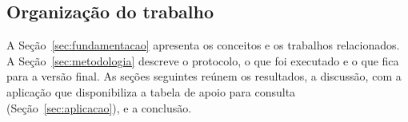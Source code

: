 \subsection{Organização do trabalho}
A Seção~\ref{sec:fundamentacao} apresenta os conceitos e os trabalhos relacionados. A
Seção~\ref{sec:metodologia} descreve o protocolo, o que foi executado e o que fica para a versão final. As seções seguintes reúnem os resultados, a discussão, com a
aplicação que disponibiliza a tabela de apoio para consulta (Seção~\ref{sec:aplicacao}), e a conclusão.
